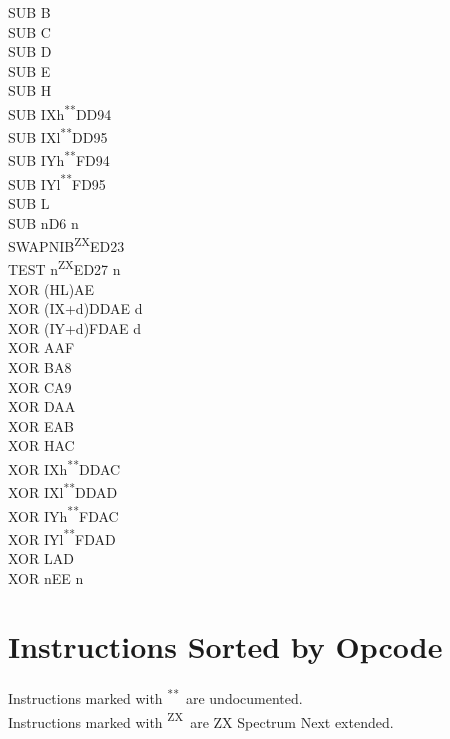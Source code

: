 \documentclass[12pt,twoside,openright,a4paper]{book}
\newcommand{\UNDOC}{\textnormal{\textsuperscript{**}}}
\newcommand{\ZXN}{\textnormal{\textsuperscript{ZX}}}
\begin{document}
\begin{multicols}{3}
{\begin{tabbing}
	SUB B\\
	SUB C\\
	SUB D\\
	SUB E\\
	SUB H\\
	SUB IXh\UNDOC\>DD94\\
	SUB IXl\UNDOC\>DD95\\
	SUB IYh\UNDOC\>FD94\\
	SUB IYl\UNDOC\>FD95\\
	SUB L\\
	SUB n\>D6 n\\
	SWAPNIB\ZXN\>ED23\\
	TEST n\ZXN\>ED27 n\\
	XOR (HL)\>AE\\
	XOR (IX+d)\>DDAE d\\
	XOR (IY+d)\>FDAE d\\
	XOR A\>AF\\
	XOR B\>A8\\
	XOR C\>A9\\
	XOR D\>AA\\
	XOR E\>AB\\
	XOR H\>AC\\
	XOR IXh\UNDOC\>DDAC\\
	XOR IXl\UNDOC\>DDAD\\
	XOR IYh\UNDOC\>FDAC\\
	XOR IYl\UNDOC\>FDAD\\
	XOR L\>AD\\
	XOR n\>EE n

	\end{tabbing}
}
\end{multicols}
\normalsize


\chapter{Instructions Sorted by Opcode}

Instructions marked with \UNDOC ~are undocumented.\\
Instructions marked with \ZXN ~are ZX Spectrum Next extended.
\end{document}
